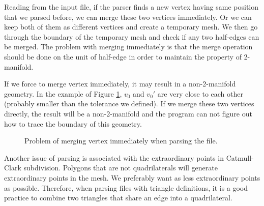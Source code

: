 \documentclass[12pt]{article}
\begin{document}
Reading from the input file, if the parser finds a new vertex having same position that we parsed before, we can merge these two vertices immediately. Or we can keep both of them as different vertices and create a temporary mesh. We then go through the boundary of the temporary mesh and check if any two half-edges can be merged. The problem with merging immediately is that the merge operation should be done on the unit of half-edge in order to maintain the property of 2-manifold. 

If we force to merge vertex immediately, it may result in a non-2-manifold geometry. In the example of Figure \ref{figure:parserMerge}, $v_0$ and $v_0'$ are very close to each other (probably smaller than the tolerance we defined). If we merge these two vertices directly, the result will be a non-2-manifold and the program can not figure out how to trace the boundary of this geometry.

\begin{figure}[ht]
  \centering
  \caption{Problem of merging vertex immediately when parsing the file.}
  \label{figure:parserMerge}
\end{figure}

Another issue of parsing is associated with the extraordinary points in Catmull-Clark subdivision. Polygons that are not quadrilaterals will generate extraordinary points in the mesh. We preferably want as less extraordinary points as possible. Therefore, when parsing files with triangle definitions, it is a good practice to combine two triangles that share an edge into a quadrilateral.
\end{document}
